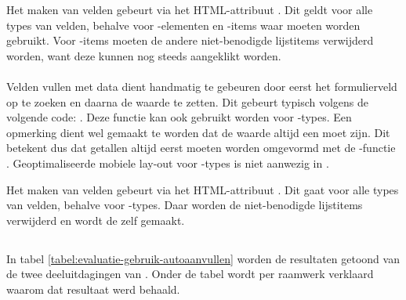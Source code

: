 Het  maken van velden gebeurt via het HTML-attribuut .
Dit geldt voor alle types van velden, behalve voor -elementen en -items waar  moeten worden gebruikt.
Voor -items moeten de andere niet-benodigde lijstitems verwijderd worden, want deze kunnen nog steeds aangeklikt worden.

\paragraph{\lungo}
Velden vullen met data dient handmatig te gebeuren door eerst het formulierveld op te zoeken en daarna de waarde te zetten.
Dit gebeurt typisch volgens de volgende code: .
Deze functie kan ook gebruikt worden voor -types.
Een opmerking dient wel gemaakt te worden dat de waarde altijd een  moet zijn.
Dit betekent dus dat getallen altijd eerst moeten worden omgevormd met de \js{}-functie . 
Geoptimaliseerde mobiele lay-out voor -types is niet aanwezig in \lungo.

Het  maken van velden gebeurt via het HTML-attribuut .
Dit gaat voor alle types van velden, behalve voor -types.
Daar worden de niet-benodigde lijstitems verwijderd en wordt de  zelf  gemaakt.


\subsection{}
\label{sec:evaluatie-gebruik-autoaanvullen}

In tabel \ref{tabel:evaluatie-gebruik-autoaanvullen} worden de resultaten getoond van de twee deeluitdagingen van .
Onder de tabel wordt per raamwerk verklaard waarom dat resultaat werd behaald.

\begin{table}[H]
\centering
{}
\caption{Gebruik van  voor \st{}~(\sta), \kendo{}~(\kendoa), \jqm{}~(\jqma) en \lungo{}~(\lungoa).}
\label{tabel:evaluatie-gebruik-autoaanvullen}
\end{table}

